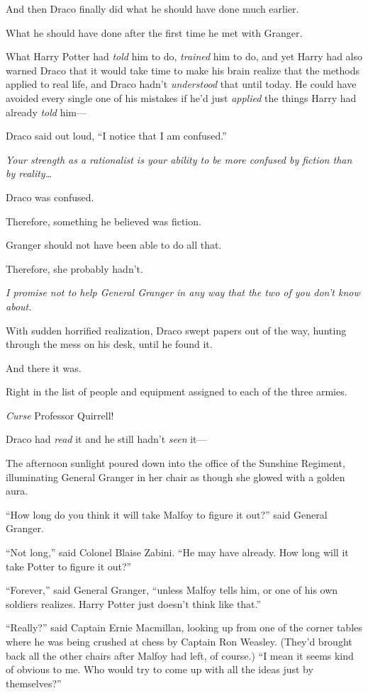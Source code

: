 And then Draco finally did what he should have done much earlier.

What he should have done after the first time he met with Granger.

What Harry Potter had \emph{told} him to do, \emph{trained} him to do, and yet Harry had also warned Draco that it would take time to make his brain realize that the methods applied to real life, and Draco hadn’t \emph{understood} that until today. He could have avoided every single one of his mistakes if he’d just \emph{applied} the things Harry had already \emph{told} him—

Draco said out loud, “I notice that I am confused.”

\emph{Your strength as a rationalist is your ability to be more confused by fiction than by reality…}

Draco was confused.

Therefore, something he believed was fiction.

Granger should not have been able to do all that.

Therefore, she probably hadn’t.

\emph{I promise not to help General Granger in any way that the two of you don’t know about.}

With sudden horrified realization, Draco swept papers out of the way, hunting through the mess on his desk, until he found it.

And there it was.

Right in the list of people and equipment assigned to each of the three armies.

\emph{Curse} Professor Quirrell!

Draco had \emph{read} it and he still hadn’t \emph{seen} it—

\later

The afternoon sunlight poured down into the office of the Sunshine Regiment, illuminating General Granger in her chair as though she glowed with a golden aura.

“How long do you think it will take Malfoy to figure it out?” said General Granger.

“Not long,” said Colonel Blaise Zabini. “He may have already. How long will it take Potter to figure it out?”

“Forever,” said General Granger, “unless Malfoy tells him, or one of his own soldiers realizes. Harry Potter just doesn’t think like that.”

“Really?” said Captain Ernie Macmillan, looking up from one of the corner tables where he was being crushed at chess by Captain Ron Weasley. (They’d brought back all the other chairs after Malfoy had left, of course.) “I mean it seems kind of obvious to me. Who would try to come up with all the ideas just by themselves?”

